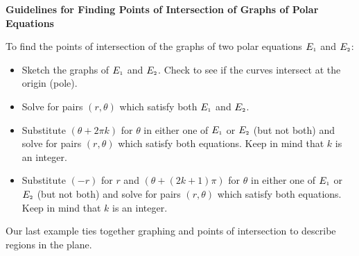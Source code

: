 \colorbox{ResultColor}{\bbm
\centerline{\textbf{Guidelines for Finding Points of Intersection of Graphs of Polar Equations}}

To find the points of intersection of the graphs of two polar equations $E_{\mbox{\tiny $1$}}$ and $E_{\mbox{\tiny $2$}}$:

\begin{itemize}

\item  Sketch the graphs of $E_{\mbox{\tiny $1$}}$ and $E_{\mbox{\tiny $2$}}$. Check to see if the curves intersect at the origin (pole).

\item  Solve for pairs $(r,\theta)$ which satisfy both $E_{\mbox{\tiny $1$}}$ and $E_{\mbox{\tiny $2$}}$. 

\item  Substitute $(\theta + 2\pi k)$ for $\theta$ in either one of $E_{\mbox{\tiny $1$}}$ or $E_{\mbox{\tiny $2$}}$  (but not both) and solve for pairs $(r,\theta)$ which satisfy both equations.  Keep in mind that $k$ is an integer.

\item  Substitute $(-r)$ for $r$ and $(\theta + (2k+1)\pi)$ for $\theta$ in either one of $E_{\mbox{\tiny $1$}}$ or $E_{\mbox{\tiny $2$}}$ (but not both) and solve for pairs $(r,\theta)$ which satisfy both equations.  Keep in mind that $k$ is an integer.


\end{itemize}

\ebm}  


Our last example ties together graphing and points of intersection to describe regions in the plane.

